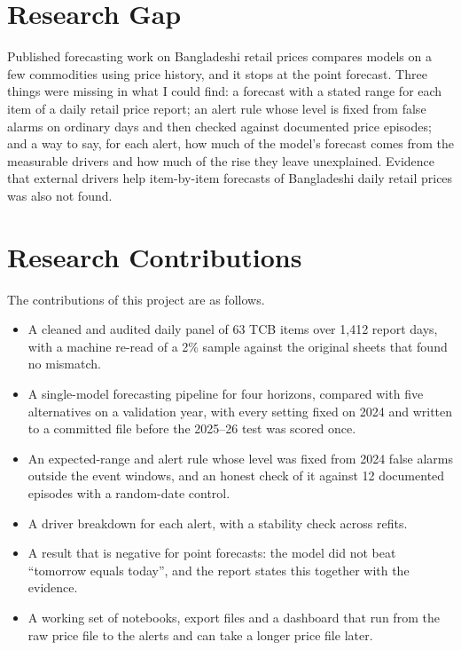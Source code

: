 \documentclass[12pt]{report}
\begin{document}
\section{Research Gap}
Published forecasting work on Bangladeshi retail prices compares models on a few commodities using price history, and it stops at the point forecast. Three things were missing in what I could find: a forecast with a stated range for each item of a daily retail price report; an alert rule whose level is fixed from false alarms on ordinary days and then checked against documented price episodes; and a way to say, for each alert, how much of the model's forecast comes from the measurable drivers and how much of the rise they leave unexplained. Evidence that external drivers help item-by-item forecasts of Bangladeshi daily retail prices was also not found.

\section{Research Contributions}
The contributions of this project are as follows.
\begin{itemize}
    \item A cleaned and audited daily panel of 63 TCB items over 1,412 report days, with a machine re-read of a 2\% sample against the original sheets that found no mismatch.
    \item A single-model forecasting pipeline for four horizons, compared with five alternatives on a validation year, with every setting fixed on 2024 and written to a committed file before the 2025--26 test was scored once.
    \item An expected-range and alert rule whose level was fixed from 2024 false alarms outside the event windows, and an honest check of it against 12 documented episodes with a random-date control.
    \item A driver breakdown for each alert, with a stability check across refits.
    \item A result that is negative for point forecasts: the model did not beat ``tomorrow equals today'', and the report states this together with the evidence.
    \item A working set of notebooks, export files and a dashboard that run from the raw price file to the alerts and can take a longer price file later.
\end{itemize}

\end{document}
